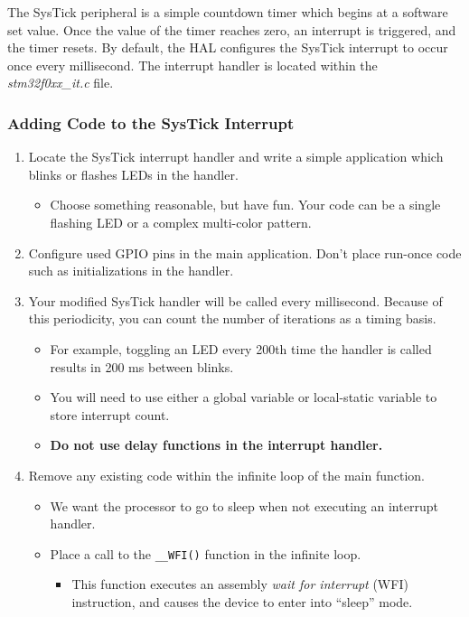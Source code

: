 \documentclass[11pt,fleqn]{book} %
\begin{document}
The SysTick peripheral is a simple countdown timer which begins at a software set value. Once the value of the timer reaches zero, an interrupt is triggered, and the timer resets. By default, the HAL configures the SysTick interrupt to occur once every millisecond. The interrupt handler is located within the \textit{stm32f0xx\_it.c} file.  

\subsubsection{Adding Code to the SysTick Interrupt}

\begin{enumerate}
    \item Locate the SysTick interrupt handler and write a simple application which blinks or flashes LEDs in the handler.
    \begin{itemize}
        \item Choose something reasonable, but have fun. Your code can be a single flashing LED or a complex multi-color pattern. 
    \end{itemize}
    \item Configure used GPIO pins in the main application. Don't place run-once code such as initializations in the handler.
    \item Your modified SysTick handler will be called every millisecond. Because of this periodicity, you can count the number of iterations as a timing basis.  
    \begin{itemize}
        \item For example, toggling an LED every 200th time the handler is called results in 200 ms between blinks. 
        \item You will need to use either a global variable or local-static variable to store interrupt count. 
        \item \textbf{Do not use delay functions in the interrupt handler.}
    \end{itemize}
    \item Remove any existing code within the infinite loop of the main function. 
    \begin{itemize}
        \item We want the processor to go to sleep when not executing an interrupt handler.
        \item Place a call to the \texttt{\_\_WFI()} function in the infinite loop. 
        \begin{itemize}
            \item This function executes an assembly \textit{wait for interrupt} (WFI) instruction, and causes the device to enter into ``sleep'' mode. 
        \end{itemize} 
    \end{itemize}
\end{enumerate}
\end{document}
